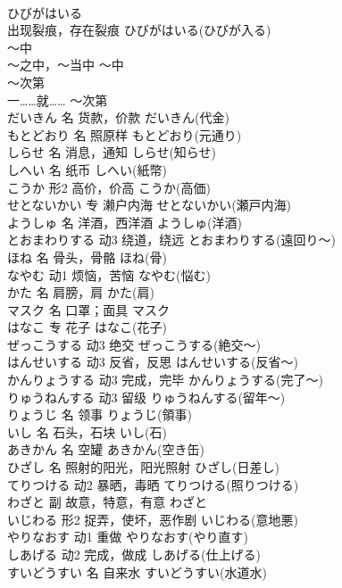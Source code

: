 \documentclass[8pt]{extreport}
\begin{document}
\begin{CJK}{UTF8}{min}
\\	ひびがはいる	
\\	出现裂痕，存在裂痕	ひびがはいる(ひびが入る)	
\\	～中	
\\	～之中，～当中	～中	
\\	～次第	
\\	一……就……	～次第	
\\	だいきん	名	货款，价款	だいきん(代金)	
\\	もとどおり	名	照原样	もとどおり(元通り)	
\\	しらせ	名	消息，通知	しらせ(知らせ)	
\\	しへい	名	纸币	しへい(紙幣)	
\\	こうか	形2	高价，价高	こうか(高価)	
\\	せとないかい	专	濑户内海	せとないかい(瀬戸内海)	
\\	ようしゅ	名	洋酒，西洋酒	ようしゅ(洋酒)	
\\	とおまわりする	动3	绕道，绕远	とおまわりする(遠回り～)	
\\	ほね	名	骨头，骨骼	ほね(骨)	
\\	なやむ	动1	烦恼，苦恼	なやむ(悩む)	
\\	かた	名	肩膀，肩	かた(肩)	
\\	マスク	名	口罩；面具	マスク	
\\	はなこ	专	花子	はなこ(花子)	
\\	ぜっこうする	动3	绝交	ぜっこうする(絶交～)	
\\	はんせいする	动3	反省，反思	はんせいする(反省～)	
\\	かんりょうする	动3	完成，完毕	かんりょうする(完了～)	
\\	りゅうねんする	动3	留级	りゅうねんする(留年～)	
\\	りょうじ	名	领事	りょうじ(領事)	
\\	いし	名	石头，石块	いし(石)	
\\	あきかん	名	空罐	あきかん(空き缶)	
\\	ひざし	名	照射的阳光，阳光照射	ひざし(日差し)	
\\	てりつける	动2	暴晒，毒晒	てりつける(照りつける)	
\\	わざと	副	故意，特意，有意	わざと	
\\	いじわる	形2	捉弄，使坏，恶作剧	いじわる(意地悪)	
\\	やりなおす	动1	重做	やりなおす(やり直す)	
\\	しあげる	动2	完成，做成	しあげる(仕上げる)	
\\	すいどうすい	名	自来水	すいどうすい(水道水)	

\end{CJK}
\end{document}
